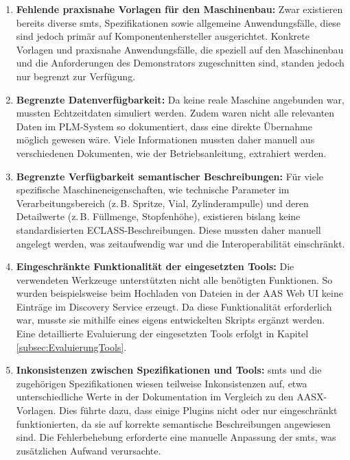 \begin{enumerate}
    \item \textbf{Fehlende praxisnahe Vorlagen für den Maschinenbau:}  
    Zwar existieren bereits diverse \acsp{smt}, Spezifikationen sowie allgemeine Anwendungsfälle, diese sind jedoch primär auf Komponentenhersteller ausgerichtet.  
    Konkrete Vorlagen und praxisnahe Anwendungsfälle, die speziell auf den Maschinenbau und die Anforderungen des Demonstrators zugeschnitten sind, standen jedoch nur begrenzt zur Verfügung.

    \item \textbf{Begrenzte Datenverfügbarkeit:}  
    Da keine reale Maschine angebunden war, mussten Echtzeitdaten simuliert werden.  
    Zudem waren nicht alle relevanten Daten im PLM-System so dokumentiert, dass eine direkte Übernahme möglich gewesen wäre.  
    Viele Informationen mussten daher manuell aus verschiedenen Dokumenten, wie der Betriebsanleitung, extrahiert werden.  

    \item \textbf{Begrenzte Verfügbarkeit semantischer Beschreibungen:}  
    Für viele spezifische Maschineneigenschaften, wie technische Parameter im Verarbeitungsbereich (z.\,B. Spritze, Vial, Zylinderampulle) und deren Detailwerte (z.\,B. Füllmenge, Stopfenhöhe), existieren bislang keine standardisierten ECLASS-Beschreibungen.  
    Diese mussten daher manuell angelegt werden, was zeitaufwendig war und die Interoperabilität einschränkt.

    \item \textbf{Eingeschränkte Funktionalität der eingesetzten Tools:}  
    Die verwendeten Werkzeuge unterstützten nicht alle benötigten Funktionen.  
    So wurden beispielsweise beim Hochladen von Dateien in der AAS Web UI keine Einträge im Discovery Service erzeugt.  
    Da diese Funktionalität erforderlich war, musste sie mithilfe eines eigens entwickelten Skripts ergänzt werden.  
    Eine detaillierte Evaluierung der eingesetzten Tools erfolgt in Kapitel \ref{subsec:EvaluierungTools}.

    \item \textbf{Inkonsistenzen zwischen Spezifikationen und Tools:}  
    \acsp{smt} und die zugehörigen Spezifikationen wiesen teilweise Inkonsistenzen auf, etwa unterschiedliche Werte in der Dokumentation im Vergleich zu den AASX-Vorlagen.  
    Dies führte dazu, dass einige Plugins nicht oder nur eingeschränkt funktionierten, da sie auf korrekte semantische Beschreibungen angewiesen sind.  
    Die Fehlerbehebung erforderte eine manuelle Anpassung der \acsp{smt}, was zusätzlichen Aufwand verursachte.
\end{enumerate}

